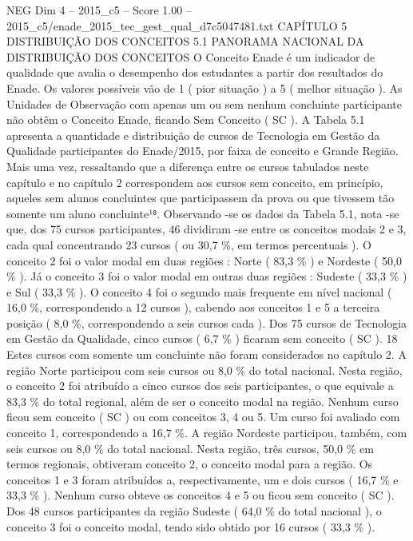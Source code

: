 \begin{textsample}{NEG Dim 4 – 2015\_c5 – Score 1.00 – 2015\_c5/enade\_2015\_tec\_gest\_qual\_d7c5047481.txt}  \label{ex:f4_neg_182}
CAPÍTULO 5 DISTRIBUIÇÃO DOS CONCEITOS 5.1 PANORAMA NACIONAL DA DISTRIBUIÇÃO DOS CONCEITOS O Conceito Enade é um indicador de qualidade que avalia o desempenho dos estudantes a partir dos resultados do Enade.
Os valores possíveis vão de 1 ( pior situação ) a 5 ( melhor situação ).
As Unidades de Observação com apenas um ou sem nenhum concluinte participante não obtêm o Conceito Enade, ficando Sem Conceito ( SC ).
A Tabela 5.1 apresenta a quantidade e distribuição de cursos de Tecnologia em Gestão da Qualidade participantes do Enade/2015, por faixa de conceito e Grande Região.
Mais uma vez, ressaltando que a diferença entre os cursos tabulados neste capítulo e no capítulo 2 correspondem aos cursos sem conceito, em princípio, aqueles sem alunos concluintes que participassem da prova ou que tivessem tão somente um aluno concluinte¹⁸.
Observando -se os dados da Tabela 5.1, nota -se que, dos 75 cursos participantes, 46 dividiram -se entre os conceitos modais 2 e 3, cada qual concentrando 23 cursos ( ou 30,7 \%, em termos percentuais ).
O conceito 2 foi o valor modal em duas regiões : Norte ( 83,3 \% ) e Nordeste ( 50,0 \% ).
Já o conceito 3 foi o valor modal em outras duas regiões : Sudeste ( 33,3 \% ) e Sul ( 33,3 \% ).
O conceito 4 foi o segundo mais frequente em nível nacional ( 16,0 \%, correspondendo a 12 cursos ), cabendo aos conceitos 1 e 5 a terceira posição ( 8,0 \%, correspondendo a seis cursos cada ).
Dos 75 cursos de Tecnologia em Gestão da Qualidade, cinco cursos ( 6,7 \% ) ficaram sem conceito ( SC ). 18 Estes cursos com somente um concluinte não foram considerados no capítulo 2.
A região Norte participou com seis cursos ou 8,0 \% do total nacional.
Nesta região, o conceito 2 foi atribuído a cinco cursos dos seis participantes, o que equivale a 83,3 \% do total regional, além de ser o conceito modal na região.
Nenhum curso ficou sem conceito ( SC ) ou com conceitos 3, 4 ou 5.
Um curso foi avaliado com conceito 1, correspondendo a 16,7 \%.
A região Nordeste participou, também, com seis cursos ou 8,0 \% do total nacional.
Nesta região, três cursos, 50,0 \% em termos regionais, obtiveram conceito 2, o conceito modal para a região.
Os conceitos 1 e 3 foram atribuídos a, respectivamente, um e dois cursos ( 16,7 \% e 33,3 \% ).
Nenhum curso obteve os conceitos 4 e 5 ou ficou sem conceito ( SC ).
Dos 48 cursos participantes da região Sudeste ( 64,0 \% do total nacional ), o conceito 3 foi o conceito modal, tendo sido obtido por 16 cursos ( 33,3 \% ).

\end{textsample}
